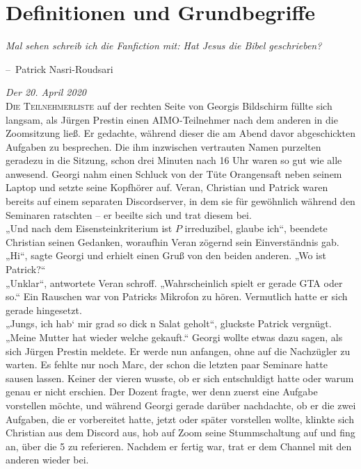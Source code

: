 \documentclass[oneside]{memoir}
\makeatletter
\newenvironment{chapquote}[2][2em]
  {\setlength{\@tempdima}{#1}%
   \def\chapquote@author{#2}%
   \parshape 1 \@tempdima \dimexpr\textwidth-2\@tempdima\relax%
   \itshape}
  {\par\normalfont\hfill--\ \chapquote@author\hspace*{\@tempdima}\par\bigskip}
\makeatother
\begin{document}
\chapter{Definitionen und Grundbegriffe} %
\begin{chapquote}{Patrick Nasri-Roudsari}
\glqq Mal sehen schreib ich die Fanfiction mit: Hat Jesus die Bibel geschrieben?\grqq
\end{chapquote}

\textit{Der 20. April 2020} \\ 
\lettrine{D}{ie Teilnehmerliste} auf der rechten Seite von Georgis Bildschirm füllte sich langsam, als Jürgen Prestin einen AIMO-Teilnehmer nach dem anderen in die Zoomsitzung ließ. Er gedachte, während dieser die am Abend davor abgeschickten Aufgaben zu besprechen. Die ihm inzwischen vertrauten Namen purzelten geradezu in die Sitzung, schon drei Minuten nach 16 Uhr waren so gut wie alle anwesend. Georgi nahm einen Schluck von der Tüte Orangensaft neben seinem Laptop und setzte seine Kopfhörer auf. Veran, Christian und Patrick waren bereits auf einem separaten Discordserver, in dem sie für gewöhnlich während den Seminaren ratschten – er beeilte sich und trat diesem bei. \\
„Und nach dem Eisensteinkriterium ist $P$ irreduzibel, glaube ich“, beendete Christian seinen Gedanken, woraufhin Veran zögernd sein Einverständnis gab. \\
„Hi“, sagte Georgi und erhielt einen Gruß von den beiden anderen. „Wo ist Patrick?“ \\
„Unklar“, antwortete Veran schroff. „Wahrscheinlich spielt er gerade GTA oder so.“
Ein Rauschen war von Patricks Mikrofon zu hören. Vermutlich hatte er sich gerade hingesetzt. \\ 
„Jungs, ich hab‘ mir grad so dick n Salat geholt“, gluckste Patrick vergnügt. „Meine Mutter hat wieder welche gekauft.“
Georgi wollte etwas dazu sagen, als sich Jürgen Prestin meldete. Er werde nun anfangen, ohne auf die Nachzügler zu warten. Es fehlte nur noch Marc, der schon die letzten paar Seminare hatte sausen lassen. Keiner der vieren wusste, ob er sich entschuldigt hatte oder warum genau er nicht erschien. Der Dozent fragte, wer denn zuerst eine Aufgabe vorstellen möchte, und während Georgi gerade darüber nachdachte, ob er die zwei Aufgaben, die er vorbereitet hatte, jetzt oder später vorstellen wollte, klinkte sich Christian aus dem Discord aus, hob auf Zoom seine Stummschaltung auf und fing an, über die 5 zu referieren. 
Nachdem er fertig war, trat er dem Channel mit den anderen wieder bei.  \\
\end{document}
